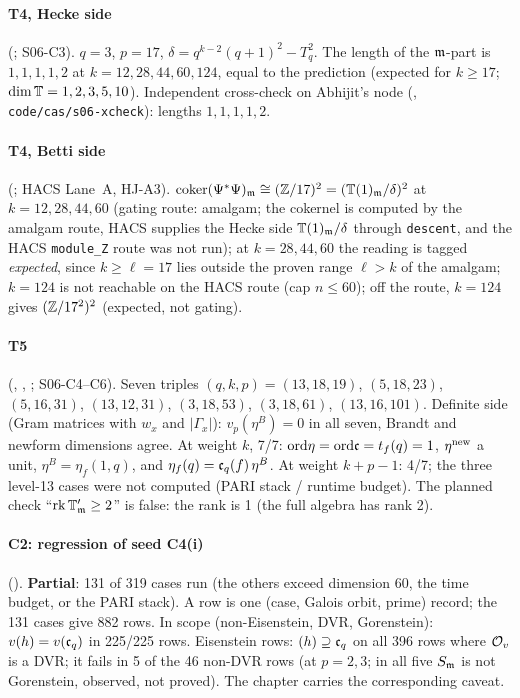 \paragraph{T4, Hecke side} (; S06-C3). $q=3$, $p=17$, $\delta=q^{k-2}(q+1)^2-T_q^2$. The length
of the $\mathfrak{m}$-part is $1,1,1,1,2$ at $k=12,28,44,60,124$, equal to the prediction (expected for $k\ge17$; $\dim\mathbb{T}=1,2,3,5,10$). Independent
cross-check on Abhijit's node (, \texttt{code/cas/s06-xcheck}): lengths $1,1,1,1,2$.

\paragraph{T4, Betti side} (; HACS Lane~A, HJ-A3). $\operatorname{coker}(\Psi^*\Psi)_{\mathfrak{m}}\cong(\mathbb{Z}/17)^2=(\mathbb{T}(1)_{\mathfrak{m}}/\delta)^2$
at $k=12,28,44,60$ (gating route: amalgam; the cokernel is computed by the amalgam route, HACS supplies the Hecke side $\mathbb{T}(1)_{\mathfrak{m}}/\delta$
through \texttt{descent}, and the HACS \texttt{module\_Z} route was not run); at $k=28,44,60$ the reading is tagged \emph{expected}, since $k\ge\ell=17$ lies
outside the proven range $\ell>k$ of the amalgam; $k=124$ is not reachable on the HACS route (cap $n\le60$); off the route,
$k=124$ gives $(\mathbb{Z}/17^2)^2$ (expected, not gating).

\paragraph{T5} (, , ; S06-C4--C6). Seven triples
$(q,k,p)=(13,18,19)$, $(5,18,23)$, $(5,16,31)$, $(13,12,31)$, $(3,18,53)$, $(3,18,61)$, $(13,16,101)$. Definite side (Gram matrices with
$w_x$ and $|\Gamma_x|$): $v_p(\eta^B)=0$ in all seven, Brandt and newform dimensions agree. At weight $k$, 7/7: $\mathrm{ord}\eta=\mathrm{ord}\mathfrak{c}=t_f(q)=1$,
$\eta^{\rm new}$ a unit, $\eta^B=\eta_f(1,q)$, and $\eta_f(q)=\mathfrak{c}_q(f)\,\eta^B$. At weight $k+p-1$: 4/7; the three level-13
cases were not computed (PARI stack / runtime budget). The planned check ``$\operatorname{rk}\mathbb{T}'_{\mathfrak{m}}\ge2$'' is false: the rank is 1 (the full
algebra has rank 2).

\paragraph{C2: regression of seed C4(i)} (). \textbf{Partial}: 131 of 319 cases run (the others exceed
dimension 60, the time budget, or the PARI stack). A row is one (case, Galois orbit, prime) record; the 131 cases give 882 rows. In scope (non-Eisenstein, DVR, Gorenstein): $v(h)=v(\mathfrak{c}_q)$ in
225/225 rows. Eisenstein rows: $(h)\supseteq\mathfrak{c}_q$ on all 396 rows where $\mathcal{O}_v$ is a DVR; it fails in 5 of the 46 non-DVR
rows (at $p=2,3$; in all five $S_{\mathfrak{m}}$ is not Gorenstein, observed, not proved). The chapter carries the corresponding caveat.

